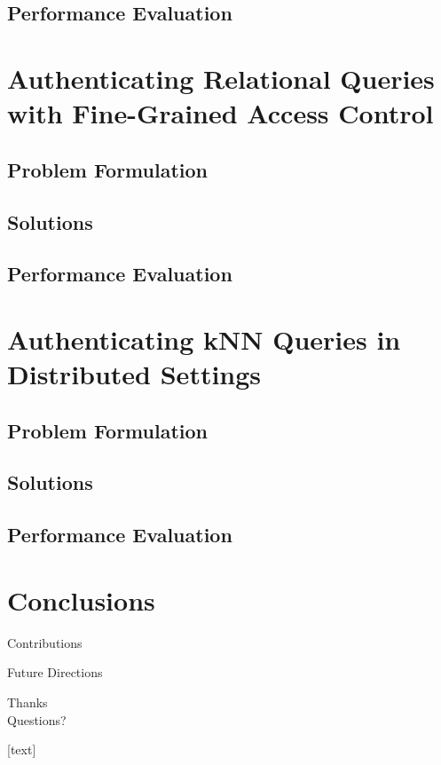 \documentclass[xcolor={dvipsnames},aspectratio=169,10pt]{beamer}
\begin{document}
\subsection{Performance Evaluation}

\section{Authenticating Relational Queries with Fine-Grained Access Control}

\subsection{Problem Formulation}

\subsection{Solutions}

\subsection{Performance Evaluation}

\section{Authenticating {kNN} Queries in Distributed Settings}

\subsection{Problem Formulation}

\subsection{Solutions}

\subsection{Performance Evaluation}

\section{Conclusions}

\begin{frame}{Contributions}
\end{frame}

\begin{frame}{Future Directions}
\end{frame}

\begin{frame}[standout]
  Thanks \\
  Questions?
\end{frame}

\appendix%

\begingroup
{}
\begin{frame}[t,allowframebreaks]{\refname}
  [text]
  \renewcommand*{\bibfont}{\scriptsize}
  \printbibliography[heading=none]%
\end{frame}
\endgroup
\end{document}
